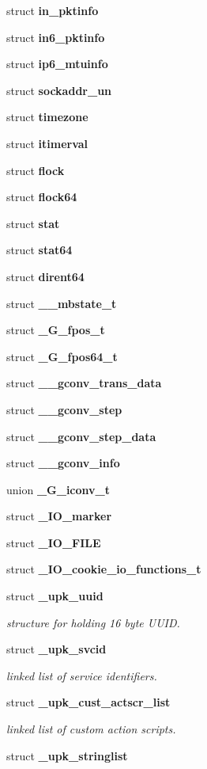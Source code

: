 \begin{DoxyCompactItemize}
struct {\bf in\_\-pktinfo}
\item 
struct {\bf in6\_\-pktinfo}
\item 
struct {\bf ip6\_\-mtuinfo}
\item 
struct {\bf sockaddr\_\-un}
\item 
struct {\bf timezone}
\item 
struct {\bf itimerval}
\item 
struct {\bf flock}
\item 
struct {\bf flock64}
\item 
struct {\bf stat}
\item 
struct {\bf stat64}
\item 
struct {\bf dirent64}
\item 
struct {\bf \_\-\_\-mbstate\_\-t}
\item 
struct {\bf \_\-G\_\-fpos\_\-t}
\item 
struct {\bf \_\-G\_\-fpos64\_\-t}
\item 
struct {\bf \_\-\_\-gconv\_\-trans\_\-data}
\item 
struct {\bf \_\-\_\-gconv\_\-step}
\item 
struct {\bf \_\-\_\-gconv\_\-step\_\-data}
\item 
struct {\bf \_\-\_\-gconv\_\-info}
\item 
union {\bf \_\-G\_\-iconv\_\-t}
\item 
struct {\bf \_\-IO\_\-marker}
\item 
struct {\bf \_\-IO\_\-FILE}
\item 
struct {\bf \_\-IO\_\-cookie\_\-io\_\-functions\_\-t}
\item 
struct {\bf \_\-upk\_\-uuid}
\begin{DoxyCompactList}\small\item\em structure for holding 16 byte UUID. \end{DoxyCompactList}\item 
struct {\bf \_\-upk\_\-svcid}
\begin{DoxyCompactList}\small\item\em linked list of service identifiers. \end{DoxyCompactList}\item 
struct {\bf \_\-upk\_\-cust\_\-actscr\_\-list}
\begin{DoxyCompactList}\small\item\em linked list of custom action scripts. \end{DoxyCompactList}\item 
struct {\bf \_\-upk\_\-stringlist}

\end{DoxyCompactItemize}
